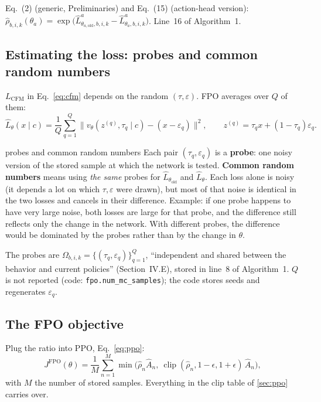\documentclass[11pt,a4paper]{article}
\newcommand{\clip}{\operatorname{clip}}
\newcommand{\Ah}{\hat A}
\newcommand{\Lc}{L_{\mathrm{CFM}}}
\newcommand{\Lh}{\hat L}
\begin{document}
\begin{paperlink}
Eq.~(2) (generic, Preliminaries) and Eq.~(15) (action-head version): $\hat\rho_{b,i,k}(\theta_a)=\exp\big(\hat L^a_{\theta_{a,\mathrm{old}},b,i,k}-\hat L^a_{\theta_a,b,i,k}\big)$. Line~16 of Algorithm~1.
\end{paperlink}

\subsection{Estimating the loss: probes and common random numbers}
$\Lc$ in Eq.~\eqref{eq:cfm} depends on the random $(\tau,\varepsilon)$. FPO averages over $Q$ of them:
\begin{equation}
\Lh_\theta(x\mid c)=\frac1Q\sum_{q=1}^{Q}\big\|v_\theta(z^{(q)},\tau_q\mid c)-(x-\varepsilon_q)\big\|^2,\qquad z^{(q)}=\tau_q x+(1-\tau_q)\varepsilon_q .
\label{eq:lhat}
\end{equation}
\begin{newc}{probes and common random numbers}
Each pair $(\tau_q,\varepsilon_q)$ is a \textbf{probe}: one noisy version of the stored sample at which the network is tested. \textbf{Common random numbers} means using \emph{the same} probes for $\Lh_{\theta_{\mathrm{old}}}$ and $\Lh_\theta$. Each loss alone is noisy (it depends a lot on which $\tau,\varepsilon$ were drawn), but most of that noise is identical in the two losses and cancels in their difference. Example: if one probe happens to have very large noise, both losses are large for that probe, and the difference still reflects only the change in the network. With different probes, the difference would be dominated by the probes rather than by the change in $\theta$.
\end{newc}

\begin{paperlink}
The probes are $\Omega_{b,i,k}=\{(\tau_q,\varepsilon_q)\}_{q=1}^Q$, ``independent and shared between the behavior and current policies'' (Section~IV.E), stored in line~8 of Algorithm~1. $Q$ is not reported (code: \texttt{fpo.num\_mc\_samples}); the code stores seeds and regenerates $\varepsilon_q$.
\end{paperlink}

\subsection{The FPO objective}
Plug the ratio into PPO, Eq.~\eqref{eq:ppo}:
\begin{equation}
J^{\mathrm{FPO}}(\theta)=\frac1M\sum_{n=1}^{M}\min\Big(\hat\rho_n\Ah_n,\ \clip(\hat\rho_n,1-\epsilon,1+\epsilon)\,\Ah_n\Big),
\label{eq:fpo}
\end{equation}
with $M$ the number of stored samples. Everything in the clip table of \cref{sec:ppo} carries over.
\end{document}

